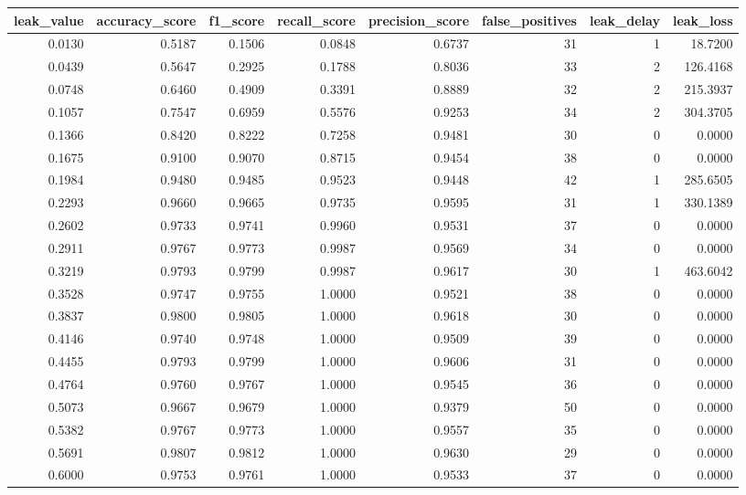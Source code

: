 \begin{tabular}{rrrrrrrr}
\toprule
leak\_value & accuracy\_score & f1\_score & recall\_score & precision\_score & false\_positives & leak\_delay & leak\_loss \\
\midrule
0.0130 & 0.5187 & 0.1506 & 0.0848 & 0.6737 & 31 & 1 & 18.7200 \\
0.0439 & 0.5647 & 0.2925 & 0.1788 & 0.8036 & 33 & 2 & 126.4168 \\
0.0748 & 0.6460 & 0.4909 & 0.3391 & 0.8889 & 32 & 2 & 215.3937 \\
0.1057 & 0.7547 & 0.6959 & 0.5576 & 0.9253 & 34 & 2 & 304.3705 \\
0.1366 & 0.8420 & 0.8222 & 0.7258 & 0.9481 & 30 & 0 & 0.0000 \\
0.1675 & 0.9100 & 0.9070 & 0.8715 & 0.9454 & 38 & 0 & 0.0000 \\
0.1984 & 0.9480 & 0.9485 & 0.9523 & 0.9448 & 42 & 1 & 285.6505 \\
0.2293 & 0.9660 & 0.9665 & 0.9735 & 0.9595 & 31 & 1 & 330.1389 \\
0.2602 & 0.9733 & 0.9741 & 0.9960 & 0.9531 & 37 & 0 & 0.0000 \\
0.2911 & 0.9767 & 0.9773 & 0.9987 & 0.9569 & 34 & 0 & 0.0000 \\
0.3219 & 0.9793 & 0.9799 & 0.9987 & 0.9617 & 30 & 1 & 463.6042 \\
0.3528 & 0.9747 & 0.9755 & 1.0000 & 0.9521 & 38 & 0 & 0.0000 \\
0.3837 & 0.9800 & 0.9805 & 1.0000 & 0.9618 & 30 & 0 & 0.0000 \\
0.4146 & 0.9740 & 0.9748 & 1.0000 & 0.9509 & 39 & 0 & 0.0000 \\
0.4455 & 0.9793 & 0.9799 & 1.0000 & 0.9606 & 31 & 0 & 0.0000 \\
0.4764 & 0.9760 & 0.9767 & 1.0000 & 0.9545 & 36 & 0 & 0.0000 \\
0.5073 & 0.9667 & 0.9679 & 1.0000 & 0.9379 & 50 & 0 & 0.0000 \\
0.5382 & 0.9767 & 0.9773 & 1.0000 & 0.9557 & 35 & 0 & 0.0000 \\
0.5691 & 0.9807 & 0.9812 & 1.0000 & 0.9630 & 29 & 0 & 0.0000 \\
0.6000 & 0.9753 & 0.9761 & 1.0000 & 0.9533 & 37 & 0 & 0.0000 \\
\bottomrule
\end{tabular}
